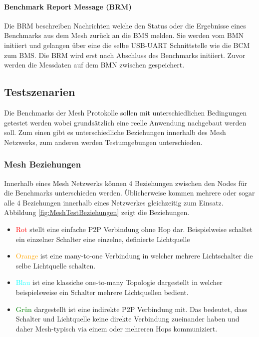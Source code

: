 \paragraph{Benchmark Report Message (BRM)}
Die BRM beschreiben Nachrichten welche den Status oder die Ergebnisse eines Benchmarks aus dem Mesh zurück an die BMS melden. Sie werden vom BMN initiiert und gelangen über eine die selbe USB-UART Schnittstelle wie die BCM zum BMS. Die BRM wird erst nach Abschluss des Benchmarks initiiert. Zuvor werden die Messdaten auf dem BMN zwischen gespeichert.



\subsection{Testszenarien}\label{subsec:TestszenarienMesh}

Die Benchmarks der Mesh Protokolle sollen mit unterschiedlichen Bedingungen getestet werden wobei grundsätzlich eine reelle Anwendung nachgebaut werden soll. Zum einen gibt es unterschiedliche Beziehungen innerhalb des Mesh Netzwerks, zum anderen werden Testumgebungen unterschieden.

\subsubsection{Mesh Beziehungen}\label{subsubsec:MeshBeziehungen}

Innerhalb eines Mesh Netzwerks können 4 Beziehungen zwischen den Nodes für die Benchmarks unterschieden werden. Üblicherweise kommen mehrere oder sogar alle 4 Beziehungen innerhalb eines Netzwerkes gleichzeitig zum Einsatz. Abbildung \ref{fig:MeshTestBeziehungen} zeigt die Beziehungen.

\begin{itemize}
 	\item \textcolor{red}{Rot} stellt eine einfache P2P Verbindung ohne Hop dar. Beispielweise schaltet ein einzelner Schalter eine einzelne, definierte Lichtquelle
 	\item \textcolor{orange}{Orange} ist eine many-to-one Verbindung in welcher mehrere Lichtschalter die selbe Lichtquelle schalten.
 	\item \textcolor{cyan}{Blau} ist eine klassiche one-to-many Topologie dargestellt in welcher beispielsweise ein Schalter mehrere Lichtquellen bedient.
 	 \item \textcolor{green}{Grün} dargestellt ist eine indirekte P2P Verbindung mit. Das bedeutet, dass Schalter und Lichtquelle keine direkte Verbindung zueinander haben und daher Mesh-typisch via einem oder mehreren Hops kommuniziert.
\end{itemize}


